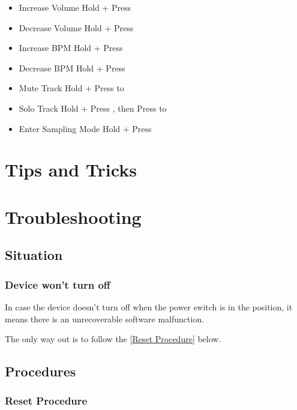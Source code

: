 \documentclass[10pt]{article}
\newcommand{\reflabel}[2]{
[\hyperref[#1]{#2}]
}
\begin{document}
\begin{multicols*}{2}
\begin{itemize}
    \item[] Increase Volume \dotfill Hold  + Press 
    \item[] Decrease Volume \dotfill Hold  + Press 
    \item[] Increase BPM \dotfill Hold  + Press 
    \item[] Decrease BPM \dotfill Hold  + Press 
    \item[] Mute Track \dotfill Hold  + Press  to 
    \item[] Solo Track \dotfill Hold  + Press , then Press  to 
    \item[] Enter Sampling Mode \dotfill Hold  + Press 
\end{itemize}

\section{Tips and Tricks}

\section{Troubleshooting}

\subsection{Situation}

\subsubsection{Device won't turn off}

In case the device doesn't turn off when the power switch is in the  position, it means there is an unrecoverable software malfunction. 

The only way out is to follow the \reflabel{procedures:reset}{Reset Procedure} below.

\subsection{Procedures}

\subsubsection{Reset Procedure}
\label{procedures:reset}


\end{multicols*}
\end{document}
